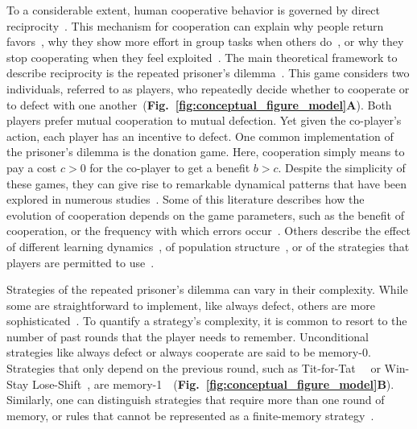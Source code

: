 \documentclass[11pt]{article}
\newcommand{\figurref}[1]{{\textbf{Fig.~\ref{#1}}}}
\begin{document}
To a considerable extent, human cooperative behavior is governed by direct reciprocity~\cite{melis:ptrs:2010,rand:TCS:2013}. 
This mechanism for cooperation can explain why people return favors~\citep{neilson:JEBO:1999}, why they show more effort in group tasks when others do~\citep{fischbacher:AER:2010}, or why they stop cooperating when they feel exploited~\citep{hilbe:ncomms:2014,Xu:NComms:2016}. 
The main theoretical framework to describe reciprocity is the repeated prisoner's dilemma~\cite{axelrod:AAAS:1981, nowak:Science:2006, sigmund2010,Garcia:FRAI:2018,hilbe:Nature:2018}. 
This game considers two individuals, referred to as players, who repeatedly decide whether to cooperate or to defect with one another~(\figurref{fig:conceptual_figure_model}\textbf{A}). 
Both players prefer mutual cooperation to mutual defection. 
Yet given the co-player's action, each player has an incentive to defect. 
One common implementation of the prisoner's dilemma is the donation game. 
Here, cooperation simply means to pay a cost $c\!>\!0$ for the co-player to get a benefit $b\!>\!c$. 
Despite the simplicity of these games, they can give rise to remarkable dynamical patterns that have been explored in numerous studies~\citep{frean:PRSB:1994,killingback:PRSB:1999,hauert:JTB:2002b,garcia:jet:2016,mcavoy:PRSA:2019,Kraines:TaD:1989,nowak:Nature:1993,imhof:PNAS:2005,grujic:jtb:2012,van-segbroeck:prl:2012,press:PNAS:2012,stewart:pnas:2013,Toupo:IJBC:2014,stewart:pnas:2014, akin:EGADS:2016,glynatsi:scientific:2020,chen:PNASnexus:2023}.
Some of this literature describes how the evolution of cooperation depends on the game parameters, such as the benefit of cooperation, or the frequency with which errors occur~\citep{boyd:JTB:1989,Hao:PRE:2015,Zhang:GEB:2018,Mamiya:PRE:2020}. 
Others describe the effect of different learning dynamics~\citep{stewart:games:2015,Mcavoy:PNAS:2022}, of population structure~\citep{brauchli:JTB:1999,szabo:PRE:2000b,allen:AmNat:2013,szolnoki:scirep:2014}, or of the strategies that players are permitted to use~\citep{baek:scientific:2016}.  

Strategies of the repeated prisoner's dilemma can vary in their complexity.
While some are straightforward to implement, like always defect, others are more sophisticated~\cite{harper:PLOSONE:2017, knight:PLOSONE:2018}.
To quantify a strategy's complexity, it is common to resort to the number of past rounds that the player needs to remember. 
Unconditional strategies like always defect or always cooperate are said to be \mbox{memory-0}. 
Strategies that only depend on the previous round, such as Tit-for-Tat~~\cite{axelrod:AAAS:1981,Duersch:IJGT:2013} or Win-Stay Lose-Shift~\cite{Kraines:TaD:1989,nowak:Nature:1993}, are \mbox{memory-1}~~(\figurref{fig:conceptual_figure_model}\textbf{B}). 
Similarly, one can distinguish strategies that require more than one round of memory, or rules that cannot be represented as a finite-memory strategy~\cite{Garcia:FRAI:2018}. 
\end{document}

